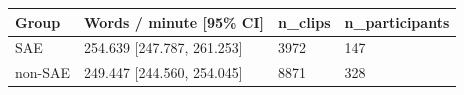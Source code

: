 \begin{tabular}{llll}
\toprule
Group & Words / minute [95\% CI] & n\_clips & n\_participants \\
\midrule
SAE & 254.639 [247.787, 261.253] & 3972 & 147 \\
non-SAE & 249.447 [244.560, 254.045] & 8871 & 328 \\
\bottomrule
\end{tabular}
